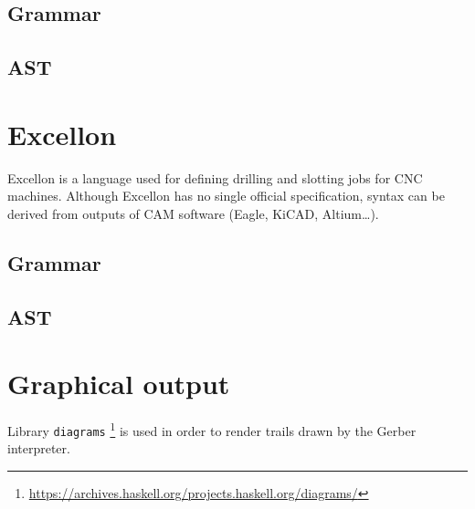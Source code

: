 \documentclass[12pt,a4paper]{article}
\begin{document}
\subsection{Grammar}
\lstset{basicstyle=\scriptsize\ttfamily}


\subsection{AST}

\section{Excellon}
Excellon is a language used for defining drilling and slotting jobs for CNC machines. Although Excellon has no single official specification, syntax can be derived from outputs of CAM software (Eagle, KiCAD, Altium\dots).

\subsection{Grammar}

\subsection{AST}

\section{Graphical output}
Library \texttt{diagrams} \footnote{\url{https://archives.haskell.org/projects.haskell.org/diagrams/}} is used in order to render trails drawn by the Gerber interpreter.
\end{document}
